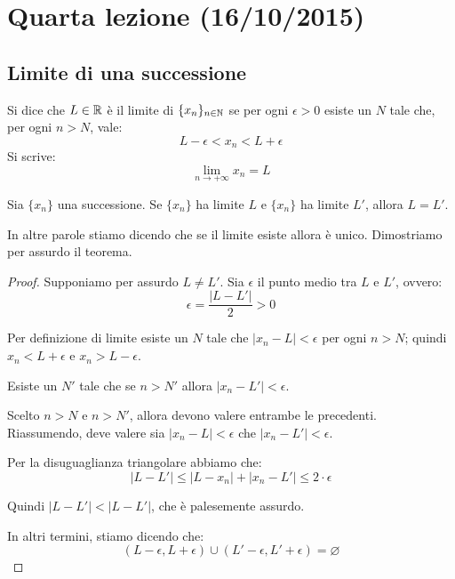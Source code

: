 \chapter{Quarta lezione (16/10/2015)}

\section{Limite di una successione}

\begin{definition}
Si dice che $L \in \mathbb R$ è il limite di $\{x_n\}_{n \in \mathbb N}$ se per ogni $\epsilon > 0$ esiste un $N$ tale che, per ogni $n > N$, vale:
\begin{equation*}
L - \epsilon < x_n < L + \epsilon
\end{equation*}
Si scrive:
\begin{equation*}
\lim_{n \to +\infty} x_n = L
\end{equation*}
\end{definition}

\begin{theorem}
Sia $\{x_n\}$ una successione. Se $\{x_n\}$ ha limite $L$ e $\{x_n\}$ ha limite $L'$, allora $L = L'$.
\end{theorem}

In altre parole stiamo dicendo che se il limite esiste allora è unico. Dimostriamo per assurdo il teorema.

\begin{proof}
Supponiamo per assurdo $L \neq L'$. Sia $\epsilon$ il punto medio tra $L$ e $L'$, ovvero:
\begin{equation*}
\epsilon = \frac{|L - L'|}{2} > 0
\end{equation*}

Per definizione di limite esiste un $N$ tale che $|x_n - L| < \epsilon$ per ogni $n > N$; quindi $x_n < L + \epsilon$ e $x_n > L - \epsilon$.

Esiste un $N'$ tale che se $n > N'$ allora $|x_n - L'| < \epsilon$.

Scelto $n > N$ e $n > N'$, allora devono valere entrambe le precedenti. Riassumendo, deve valere sia $|x_n - L| < \epsilon$ che $|x_n - L'| < \epsilon$.

Per la disuguaglianza triangolare abbiamo che:
\begin{equation*}
|L - L'| \le |L - x_n| + |x_n - L'| \le 2\cdot\epsilon
\end{equation*}

Quindi $|L - L'| < |L - L'|$, che è palesemente assurdo.

In altri termini, stiamo dicendo che:
\begin{equation*}
(L - \epsilon, L + \epsilon) \cup (L' - \epsilon, L' + \epsilon) = \varnothing
\end{equation*}
\end{proof}

